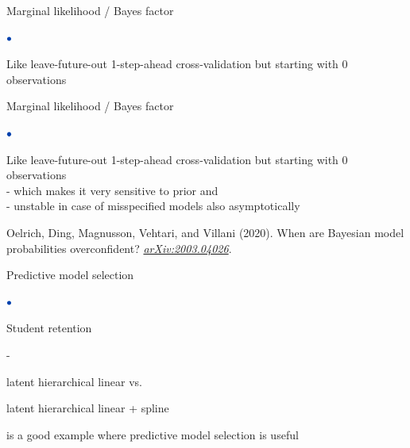 \documentclass[english,t]{beamer}
\newenvironment{list1}{
   \begin{list}{$\color{list1}\bullet$}{\itemsep=6pt}}{
  \end{list}}
\newenvironment{list2}{
  \begin{list}{-}{\baselineskip=12pt\itemsep=2pt}}{
  \end{list}}
\begin{document}
\begin{frame}{Marginal likelihood / Bayes factor}

\vspace{-0.3\baselineskip}
\begin{list1}
\item Like leave-future-out 1-step-ahead cross-validation but starting with 0 observations\\
\end{list1}
\vspace{-0.5\baselineskip}

\end{frame}

\begin{frame}{Marginal likelihood / Bayes factor}

\vspace{-0.3\baselineskip}
\begin{list1}
\item Like leave-future-out 1-step-ahead cross-validation but starting with 0 observations\\
  {- which makes it very sensitive to prior}
  {and \\- unstable in case of misspecified
    models}{ also asymptotically}
\item Oelrich, Ding, Magnusson, Vehtari, and Villani (2020). When are Bayesian model probabilities overconfident? \textit{\href{https://arxiv.org/abs/2003.04026}{arXiv:2003.04026}}.
  
\end{list1}

\end{frame}

\begin{frame}{Predictive model selection}

  \begin{list1}
  \item Student retention
    \begin{list2}
      \item latent hierarchical linear vs.
      \item latent hierarchical linear + spline
      \end{list2}
      is a good example where predictive model selection is useful
  \end{list1}

\end{frame}
\end{document}
